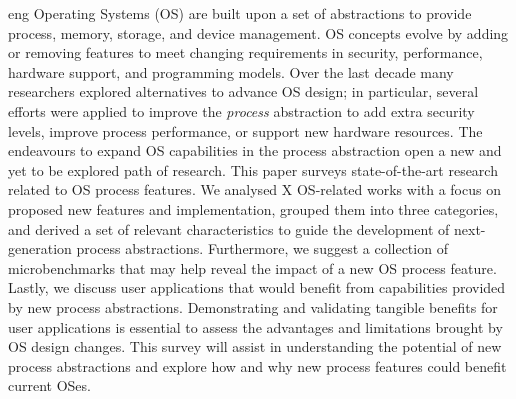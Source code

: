 \begin{resumo}{eng}
Operating Systems (OS) are built upon a set of abstractions to provide process,
memory, storage, and device management. OS concepts evolve by
adding or removing features to meet changing requirements in security, performance,
hardware support, and programming models. Over the last decade many researchers
explored alternatives to advance OS design; in particular, several efforts were
applied to improve the \emph{process} abstraction to add extra security
levels, improve process performance, or support new hardware
resources. The endeavours to expand OS capabilities in the process abstraction
open a new and yet to be explored path of research. This paper surveys
state-of-the-art research related to OS process features. We analysed X OS-related works
with a focus on proposed new features and implementation, grouped them into
three categories, and derived a set of relevant characteristics to guide the
development of next-generation process abstractions. Furthermore, we suggest a
collection of microbenchmarks that may help reveal the impact of a new OS
process feature. Lastly, we discuss user applications that
would benefit from capabilities provided by new process
abstractions. Demonstrating and validating tangible benefits for user applications
is essential to assess the advantages and  limitations brought by OS
design changes. This survey will assist in understanding the potential of new
process abstractions and explore how and why new process features could benefit
current OSes.

\end{resumo}

\makeatletter
\if@openright\cleardoublepage\else\clearpage\fi
\makeatother



